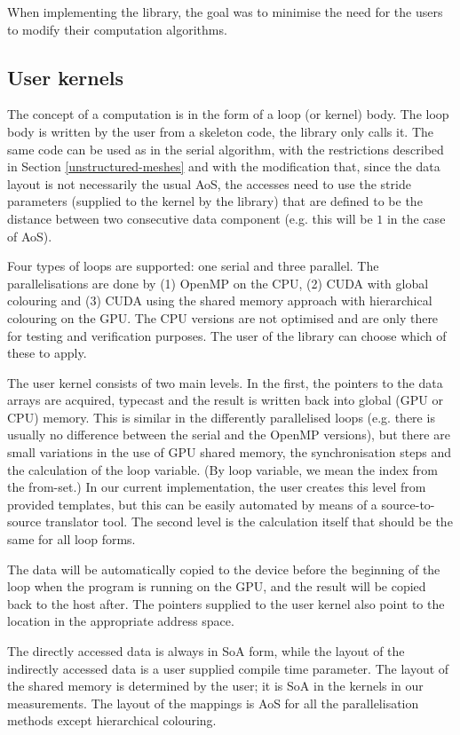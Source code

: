 When implementing the library, the goal was to minimise the need for the users
to modify their computation algorithms.

\subsection{User kernels}

The concept of a computation is in the form of a loop (or kernel) body. The loop
body is written by the user from a skeleton code, the library only calls it. The
same code can be used as in the serial algorithm, with the restrictions
described in Section \ref{unstructured-meshes} and with the modification that,
since the data layout is not necessarily the usual AoS, the accesses need to use
the stride parameters (supplied to the kernel by the library) that are defined
to be the distance between two consecutive data component (e.g. this will be $1$
in the case of AoS).

Four types of loops are supported: one serial and three parallel. The
parallelisations are done by (1) OpenMP on the CPU, (2) CUDA with global
colouring and (3) CUDA using the shared memory approach with hierarchical
colouring on the GPU. The CPU versions are not optimised and are only there for
testing and verification purposes. The user of the library can choose which of
these to apply.

The user kernel consists of two main levels. In the first, the pointers to the
data arrays are acquired, typecast and the result is written back into global
(GPU or CPU) memory. This is similar in the differently parallelised loops (e.g.
there is usually no difference between the serial and the OpenMP versions), but
there are small variations in the use of GPU shared memory, the synchronisation
steps and the calculation of the loop variable. (By loop variable, we mean the
index from the from-set.) In our current implementation, the user creates this
level from provided templates, but this can be easily automated by means of a
source-to-source translator tool. The second level is the calculation itself
that should be the same for all loop forms.

The data will be automatically copied to the device before the beginning of the
loop when the program is running on the GPU, and the result will be copied back
to the host after. The pointers supplied to the user kernel also point to the
location in the appropriate address space.

The directly accessed data is always in SoA form, while the layout of the
indirectly accessed data is a user supplied compile time parameter. The layout
of the shared memory is determined by the user; it is SoA in the kernels in our
measurements. The layout of the mappings is AoS for all the parallelisation
methods except hierarchical colouring.


